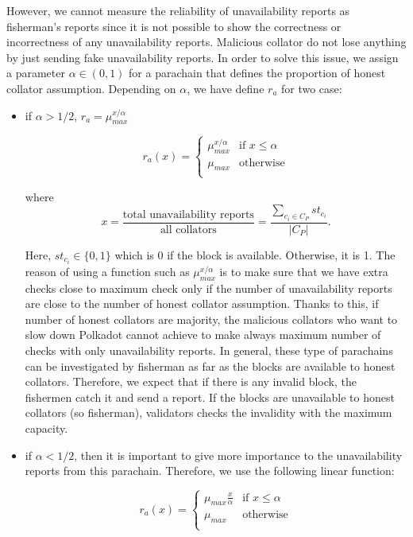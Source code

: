 However, we cannot measure the reliability of unavailability reports as fisherman's reports since it is not possible to show the correctness or incorrectness of any unavailability reports. Malicious collator do not lose anything by just sending fake unavailability reports. In order to solve this issue, we assign a parameter $\alpha \in (0,1)$ for a parachain that defines the proportion of honest collator assumption. Depending on $\alpha$, we have define $r_a$ for two case:
\begin{itemize}
    \item if $\alpha > 1/2$, $r_a = \mu_{max}^{x/\alpha}$ 
    
        \[   
    r_a(x)= 
     \begin{cases}
       \mu_{max}^{x/\alpha} & \text{if } x \leq \alpha \\
       \mu_{max} &\text{otherwise} \\ 
     \end{cases}
\]  
    
    where 
    $$x = \frac{\text{total unavailability reports}}{\text{all collators}} = \frac{\sum_{c_i \in C_P}st_{c_i}}{|C_P|}.$$
    
    Here, $st_{c_i}\in \{0,1\}$ which is 0 if the block is available. Otherwise, it is 1. The reason of using a function such as $\mu_{max}^{x/\alpha}$ is to make sure that we have extra checks close to maximum check only if the number of unavailability reports are close to the number of honest collator assumption. Thanks to this, if number of honest collators are majority, the malicious collators who want to slow down Polkadot cannot achieve to make always maximum number of checks with only unavailability reports. In general, these type of parachains can be investigated by fisherman as far as the blocks are available to honest collators. Therefore, we expect that if there is any invalid block, the fishermen catch it and send a report. If the blocks are unavailable to honest collators (so fisherman), validators checks the invalidity with the maximum capacity.  
    
    \item if $\alpha < 1/2$, then it is important to give more importance to the unavailability reports from this parachain. Therefore, we use the following linear function:
    
    \[   
    r_a(x)= 
     \begin{cases}
       \mu_{max}\frac{x}{\alpha} & \text{if } x \leq \alpha \\
       \mu_{max} &\text{otherwise} \\ 
     \end{cases}
\]  
\end{itemize}

